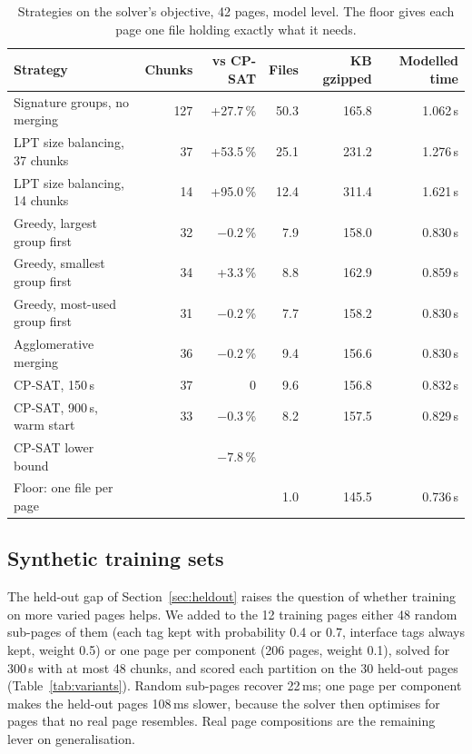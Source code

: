 \documentclass[11pt]{article}
\begin{document}
\begin{table}[t]
\centering\small
\caption{Strategies on the solver's objective, 42 pages, model level. The floor gives each page one file holding exactly what it needs.}
\label{tab:algos}
\setlength{\tabcolsep}{5pt}
\begin{tabular}{lrrrrr}
\toprule
Strategy & Chunks & vs CP-SAT & Files & KB gzipped & Modelled time\\
\midrule
Signature groups, no merging & 127 & +27.7\,\% & 50.3 & 165.8 & 1.062\,s\\
LPT size balancing, 37 chunks & 37 & +53.5\,\% & 25.1 & 231.2 & 1.276\,s\\
LPT size balancing, 14 chunks & 14 & +95.0\,\% & 12.4 & 311.4 & 1.621\,s\\
Greedy, largest group first & 32 & $-0.2$\,\% & 7.9 & 158.0 & 0.830\,s\\
Greedy, smallest group first & 34 & +3.3\,\% & 8.8 & 162.9 & 0.859\,s\\
Greedy, most-used group first & 31 & $-0.2$\,\% & 7.7 & 158.2 & 0.830\,s\\
Agglomerative merging & 36 & $-0.2$\,\% & 9.4 & 156.6 & 0.830\,s\\
CP-SAT, 150\,s & 37 & 0 & 9.6 & 156.8 & 0.832\,s\\
CP-SAT, 900\,s, warm start & 33 & $-0.3$\,\% & 8.2 & 157.5 & 0.829\,s\\
CP-SAT lower bound & & $-7.8$\,\% & & &\\
Floor: one file per page & & & 1.0 & 145.5 & 0.736\,s\\
\bottomrule
\end{tabular}
\end{table}

\subsection{Synthetic training sets}\label{sec:variants}
The held-out gap of Section~\ref{sec:heldout} raises the question of whether training on more varied pages helps. We added to the 12 training pages either 48 random sub-pages of them (each tag kept with probability 0.4 or 0.7, interface tags always kept, weight 0.5) or one page per component (206 pages, weight 0.1), solved for 300\,s with at most 48 chunks, and scored each partition on the 30 held-out pages (Table~\ref{tab:variants}). Random sub-pages recover 22\,ms; one page per component makes the held-out pages 108\,ms slower, because the solver then optimises for pages that no real page resembles. Real page compositions are the remaining lever on generalisation.
\end{document}

